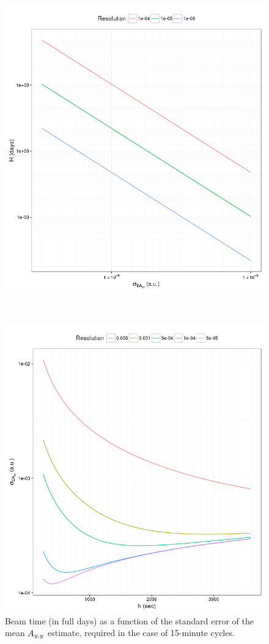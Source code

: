 \documentclass{report}
\begin{document}
\begin{figure}[h]
	\centering
	\begin{minipage}{.5\textwidth}
		\centering
		\includegraphics[scale=.5]{BeamTime_15minCycles}
		\caption{Beam time (in full days) as a function of the standard error of the mean $\Ayy$ estimate, required in the case of 15-minute cycles.\label{fig:BeamTime}}
	\end{minipage}~~~~ %
	\begin{minipage}{.5\textwidth}
		\centering
		\includegraphics[scale=.5]{SEAyy_varB_15min}

\end{minipage}
\end{figure}
\end{document}
